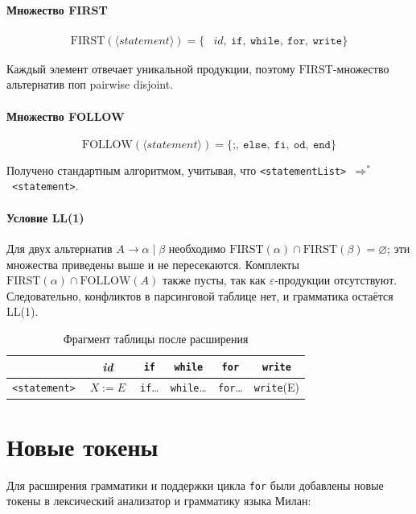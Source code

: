 \documentclass[areasetadvanced]{scrartcl}
\begin{document}
\paragraph{Множество FIRST}

\[
\begin{aligned}
\mathrm{FIRST}(\langle statement\rangle)=
\{&\textit{id},\
  \texttt{if},\
  \texttt{while},\
  \texttt{for},\
  \texttt{write} \}
\end{aligned}
\]

Каждый элемент отвечает уникальной продукции,  
поэтому $\mathrm{FIRST}$-множество альтернатив поп pairwise disjoint.

\paragraph{Множество FOLLOW}

\[
\mathrm{FOLLOW}(\langle statement\rangle)=
\{\texttt{;},\ \texttt{else},\ \texttt{fi},\ \texttt{od},\ \texttt{end}\}
\]

Получено стандартным алгоритмом, учитывая,
что \verb|<statementList>|~$\Rightarrow^*$~\verb|<statement>|.

\paragraph{Условие LL(1)}

Для двух альтернатив $A\to\alpha\mid\beta$ необходимо  
$\mathrm{FIRST}(\alpha)\cap\mathrm{FIRST}(\beta)=\varnothing$;  
эти множества приведены выше и не пересекаются.
Комплекты
$\mathrm{FIRST}(\alpha)\cap\mathrm{FOLLOW}(A)$
также пусты, так как $\varepsilon$-продукции отсутствуют.
Следовательно, конфликтов в парсинговой таблице нет,
и грамматика остаётся LL(1).

\begin{table}[H]
\centering\small
\caption{Фрагмент таблицы после расширения}
\begin{tabular}{|c|c|c|c|c|c|}
\hline
             & \textit{id} & \texttt{if} & \texttt{while} & \texttt{for} & \texttt{write} \\
\hline
\verb|<statement>| &
$\;X:=E\;$ &
\texttt{if}… &
\texttt{while}… &
\texttt{for}… &
\texttt{write}(E) \\
\hline
\end{tabular}
\end{table}

\newpage
\section{Новые токены}
Для расширения грамматики и поддержки цикла \texttt{for} были добавлены новые токены в лексический анализатор и грамматику языка Милан:
\end{document}
